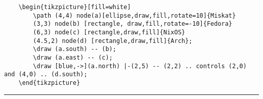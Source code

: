 \documentclass{article}
\theoremstyle{mytheoremstyle}
\theoremstyle{mytheoremstyle}
\theoremstyle{myproblemstyle}
\begin{document}
\begin{minipage}{0.7\textwidth}
	\begin{verbatim}
  	\begin{tikzpicture}[fill=white]
		\path (4,4) node(a)[ellipse,draw,fill,rotate=10]{Miskat}
		(3,3) node(b) [rectangle, draw,fill,rotate=-10]{Fedora}
		(6,3) node(c) [rectangle,draw,fill]{NixOS}
		(4.5,2) node(d) [rectangle,draw,fill]{Arch};
		\draw (a.south) -- (b);
		\draw (a.east) -- (c);
		\draw [blue,->](a.north) |-(2,5) -- (2,2) .. controls (2,0) and (4,0) .. (d.south);
	\end{tikzpicture}
  \end{verbatim}
\end{minipage}
\hrule
\begin{minipage}

\end{minipage}
\end{document}
